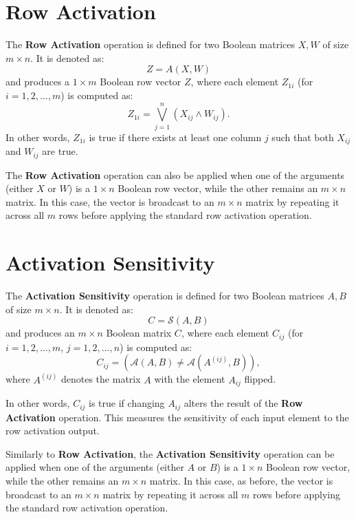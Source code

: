 \documentclass{article}
\begin{document}
\section{Row Activation}
The \textbf{Row Activation} operation is defined for two Boolean matrices \( X, W \) of size \( m \times n \). It is denoted as:
\[
Z = A(X, W)
\]
and produces a \( 1 \times m \) Boolean row vector \( Z \), where each element \( Z_{1i} \) (for \( i = 1, 2, \dots, m \)) is computed as:  
\[
Z_{1i} = \bigvee_{j=1}^{n} \left( X_{ij} \wedge W_{ij} \right).
\]
In other words, \( Z_{1i} \) is true if there exists at least one column \( j \) such that both \( X_{ij} \) and \( W_{ij} \) are true.

The \textbf{Row Activation} operation can also be applied when one of the arguments (either \( X \) or \( W \)) is a \( 1 \times n \) Boolean row vector, while the other remains an \( m \times n \) matrix. In this case, the vector is broadcast to an \( m \times n \) matrix by repeating it across all \( m \) rows before applying the standard row activation operation.

\section{Activation Sensitivity}
The \textbf{Activation Sensitivity} operation is defined for two Boolean matrices \( A, B \) of size \( m \times n \). It is denoted as:
\[
C = \mathcal{S}(A, B)
\]
and produces an \( m \times n \) Boolean matrix \( C \), where each element \( C_{ij} \) (for \( i = 1, 2, \dots, m \), \( j = 1, 2, \dots, n \)) is computed as:
\[
C_{ij} = \left( \mathcal{A}(A, B) \neq \mathcal{A}(A^{(ij)}, B) \right),
\]
where \( A^{(ij)} \) denotes the matrix \( A \) with the element \( A_{ij} \) flipped.

In other words, \( C_{ij} \) is true if changing \( A_{ij} \) alters the result of the \textbf{Row Activation} operation. This measures the sensitivity of each input element to the row activation output.

Similarly to \textbf{Row Activation}, the \textbf{Activation Sensitivity} operation can be applied when one of the arguments (either \( A \) or \( B \)) is a \( 1 \times n \) Boolean row vector, while the other remains an \( m \times n \) matrix. In this case, as before, the vector is broadcast to an \( m \times n \) matrix by repeating it across all \( m \) rows before applying the standard row activation operation.
\end{document}
